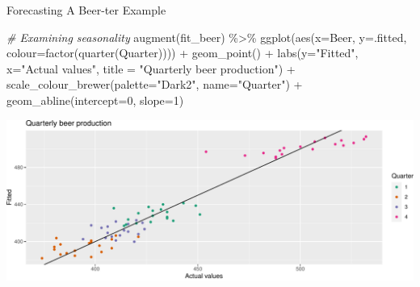 \documentclass[
  ignorenonframetext,
]{beamer}
\newenvironment{Shaded}{\begin{snugshade}}{\end{snugshade}}
\newcommand{\AttributeTok}[1]{\textcolor[rgb]{0.77,0.63,0.00}{#1}}
\newcommand{\CommentTok}[1]{\textcolor[rgb]{0.56,0.35,0.01}{\textit{#1}}}
\newcommand{\DecValTok}[1]{\textcolor[rgb]{0.00,0.00,0.81}{#1}}
\newcommand{\FunctionTok}[1]{\textcolor[rgb]{0.00,0.00,0.00}{#1}}
\newcommand{\NormalTok}[1]{#1}
\newcommand{\SpecialCharTok}[1]{\textcolor[rgb]{0.00,0.00,0.00}{#1}}
\newcommand{\StringTok}[1]{\textcolor[rgb]{0.31,0.60,0.02}{#1}}
\begin{document}
\begin{frame}[fragile]{Forecasting \textbar{} \small A Beer-ter Example}
\protect\hypertarget{forecasting-a-beer-ter-example-4}{}
\tiny

\begin{Shaded}
\begin{Highlighting}[]
\CommentTok{\# Examining seasonality}
\FunctionTok{augment}\NormalTok{(fit\_beer) }\SpecialCharTok{\%\textgreater{}\%}
  \FunctionTok{ggplot}\NormalTok{(}\FunctionTok{aes}\NormalTok{(}\AttributeTok{x=}\NormalTok{Beer, }\AttributeTok{y=}\NormalTok{.fitted, }\AttributeTok{colour=}\FunctionTok{factor}\NormalTok{(}\FunctionTok{quarter}\NormalTok{(Quarter)))) }\SpecialCharTok{+}
    \FunctionTok{geom\_point}\NormalTok{() }\SpecialCharTok{+}
    \FunctionTok{labs}\NormalTok{(}\AttributeTok{y=}\StringTok{"Fitted"}\NormalTok{, }\AttributeTok{x=}\StringTok{"Actual values"}\NormalTok{, }\AttributeTok{title =} \StringTok{"Quarterly beer production"}\NormalTok{) }\SpecialCharTok{+}
    \FunctionTok{scale\_colour\_brewer}\NormalTok{(}\AttributeTok{palette=}\StringTok{"Dark2"}\NormalTok{, }\AttributeTok{name=}\StringTok{"Quarter"}\NormalTok{) }\SpecialCharTok{+}
    \FunctionTok{geom\_abline}\NormalTok{(}\AttributeTok{intercept=}\DecValTok{0}\NormalTok{, }\AttributeTok{slope=}\DecValTok{1}\NormalTok{)}
\end{Highlighting}
\end{Shaded}

\includegraphics{Time-series-regression-models_files/figure-beamer/unnamed-chunk-46-1.pdf}

\normalfont
\end{frame}
\end{document}
